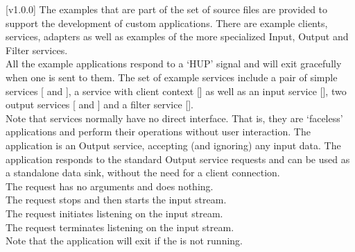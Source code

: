 [v1.0.0]
%
The examples that are part of the \mplusm{} set of source files are provided to support
the development of custom applications.
There are example clients, services, adapters as well as examples of the more specialized
Input, Output and Filter services.\\

All the example applications respond to a `HUP' signal and will exit gracefully when one
is sent to them.
The set of example services include a pair of simple services
[ and
], a service with client context
[] as well as an input service
[], two output services
[ and
] and a filter service
[].\\

Note that services normally have no direct interface.
That is, they are `faceless' applications and perform their operations without user
interaction.
The  application is an Output
service, accepting (and ignoring) any input data.
The application responds to the standard Output service requests and can be used as a
standalone data sink, without the need for a client connection.\\

The  request has no arguments and
does nothing.\\

The  request stops and then
starts the input stream.\\

The  request initiates listening
on the input stream.\\

The  request terminates listening
on the input stream.\\

Note that the application will exit if the
 is not running.\\

